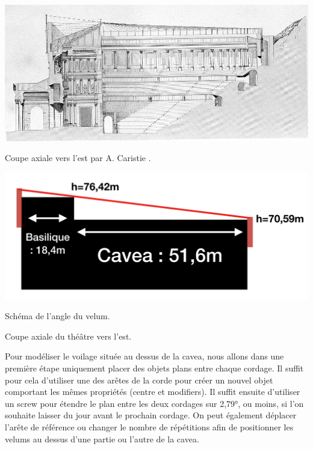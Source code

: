  \begin{figureth}
	\begin{subfigureth}{0.49\textwidth}
		\includegraphics[width=\linewidth]{images/velum2}
	\caption[Coupe axiale vers l'est par A. Caristie]{Coupe axiale vers l'est par A. Caristie \footnotemark.} 
	\label{velum2} 
	\end{subfigureth}	
	\begin{subfigureth}{0.49\textwidth}
		\includegraphics[width=\linewidth]{images/dessinvelum}
		\caption{Schéma de l'angle du velum.}
		\label{dessinvelum} 		
	\end{subfigureth}	
	\caption{Coupe axiale du théâtre vers l'est.}
\end{figureth}

Pour modéliser le voilage située au dessus de la \gls{cavea}, nous allons dans une première étape uniquement placer des objets plans entre chaque cordage. Il suffit pour cela d'utiliser une des arêtes de la corde pour créer un nouvel objet comportant les mêmes propriétés (centre et \glspl{modifier}). Il suffit ensuite d'utiliser un \gls{screw} pour étendre le plan entre les deux cordages sur 2,79°, ou moins, si l'on souhaite laisser du jour avant le prochain cordage. On peut également déplacer l'arête de référence ou changer le nombre de répétitions afin de positionner les \glspl{velum} au dessus d'une partie ou l'autre de la \gls{cavea}. 

